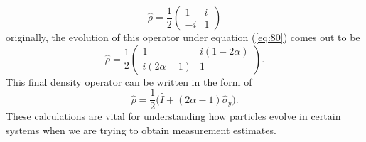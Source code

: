 \documentclass[twocolumn]{article}
\begin{document}
\begin{equation} \label{eq:84}
\hat{\rho}=\frac{1}{2}
\begin{pmatrix}
1 & i \\
-i & 1
\end{pmatrix}
\end{equation}
originally, the evolution of this operator under equation (\ref{eq:80}) comes out to be
\begin{equation} \label{eq:85}
\hat{\rho}=\frac{1}{2}
\begin{pmatrix}
1 & i(1-2\alpha) \\
i(2\alpha-1) & 1
\end{pmatrix}.
\end{equation}
This final density operator can be written in the form of 
\begin{equation} \label{eq:86}
\hat{\rho}=\frac{1}{2}\big(\hat{I}+(2\alpha-1)\hat{\sigma}_y\big).
\end{equation}
These calculations are vital for understanding how particles evolve in certain systems when we are trying to obtain measurement estimates. 
\end{document}
